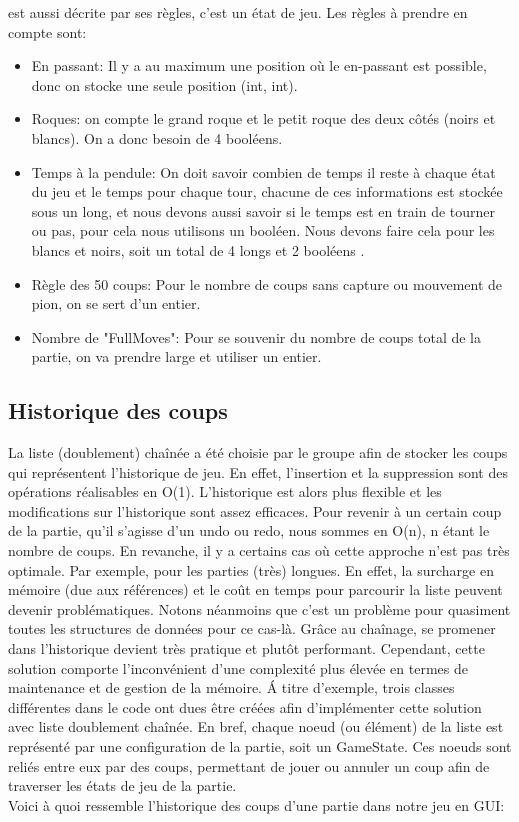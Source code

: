 \documentclass{article}
\begin{document}
est aussi décrite par ses règles, c'est un état de jeu. Les règles à prendre en compte sont:\\
\begin{itemize}
   \item En passant: Il y a au maximum une position où le en-passant est possible, donc on stocke une seule position (int, int).
    \item Roques: on compte le grand roque et le petit roque des deux côtés (noirs et blancs). On a donc besoin de 4 booléens.
   \item Temps à la pendule: On doit savoir combien de temps il reste à chaque état du jeu et le temps pour chaque tour, chacune de ces informations est stockée sous un long, et nous devons aussi savoir si le temps est en train de tourner ou pas, pour cela nous utilisons un booléen. Nous devons faire cela pour les blancs et noirs, soit un total de 4 longs et 2 booléens .
   \item Règle des 50 coups: Pour le nombre de coups sans capture ou mouvement de pion, on se sert d’un entier.
   \item Nombre de "FullMoves": Pour se souvenir du nombre de coups total de la partie, on va prendre large et utiliser un entier.\\
\end{itemize}

\subsection{Historique des coups}
\par La liste (doublement) chaînée a été choisie par le groupe afin de stocker les coups qui représentent l'historique de jeu.
En effet, l'insertion et la suppression sont des opérations réalisables en O(1). L'historique est alors plus flexible et les
modifications sur l'historique sont assez efficaces. Pour revenir à un certain coup de la partie, qu'il s'agisse d'un undo ou redo,
nous sommes en O(n), n étant le nombre de coups. En revanche, il y a certains cas où cette approche n'est pas très optimale.
Par exemple, pour les parties (très) longues. En effet, la surcharge en mémoire (due aux références) et le coût en temps pour
parcourir la liste peuvent devenir problématiques. Notons néanmoins que c'est un problème pour quasiment toutes les structures de
données pour ce cas-là. Grâce au chaînage, se promener dans l'historique devient très pratique et plutôt performant.
Cependant, cette solution comporte l'inconvénient d'une complexité plus élevée en termes de maintenance et de gestion de la mémoire.
\'A titre d'exemple, trois classes différentes dans le code ont dues être créées afin d'implémenter cette solution avec liste doublement chaînée.
En bref, chaque noeud (ou élément) de la liste est représenté par une configuration de la partie, soit un GameState.
Ces noeuds sont reliés entre eux par des coups, permettant de jouer ou annuler un coup afin de traverser les états de jeu
de la partie.\\
Voici à quoi ressemble l'historique des coups d'une partie dans notre jeu en GUI:\\
\end{document}
